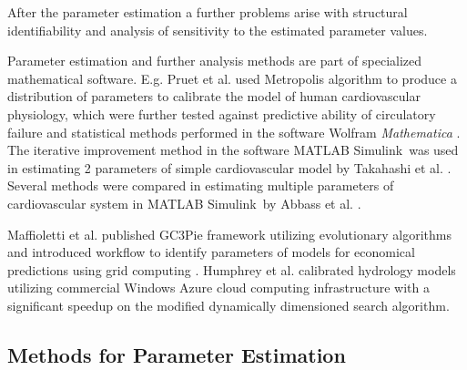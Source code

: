 After the parameter estimation a further problems arise with structural identifiability and analysis of sensitivity to the estimated parameter values\cite[p.~176]{khoo2000}. 

Parameter estimation and further analysis methods are part of specialized mathematical software. E.g. Pruet et al. used Metropolis algorithm to produce a distribution of parameters to calibrate the model of human cardiovascular physiology, which were further tested against predictive ability of circulatory failure and statistical methods performed in the software Wolfram \textit{Mathematica} \cite{Pruett2013}. The iterative improvement method in the software MATLAB Simulink\textregistered ~was used in estimating 2 parameters of simple cardiovascular model by Takahashi et al. \cite{Takahashi2013}. Several methods were compared in estimating multiple parameters of cardiovascular system in MATLAB Simulink\textregistered ~by Abbass et al. \cite{Abbass2012}.

Maffioletti et al. published GC3Pie framework utilizing evolutionary algorithms and introduced workflow to identify parameters of models for economical predictions using grid computing \cite{maffioletti2012computational}. Humphrey et al. calibrated hydrology models utilizing commercial Windows Azure cloud computing infrastructure with a significant speedup on the modified dynamically dimensioned search algorithm\cite{Humphrey2012,Tolson2007}. 




\subsection{Methods for Parameter Estimation}
\label{sec:methodsestimation}

